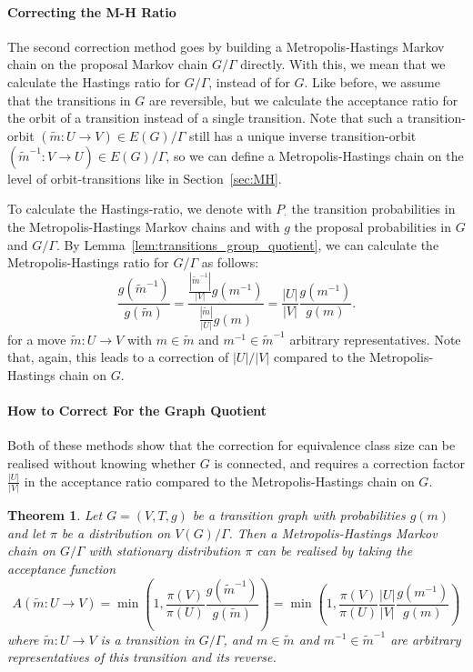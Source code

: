\documentclass{article}
\newtheorem{theorem}{Theorem}
\theoremstyle{definition}
\begin{document}
\paragraph{Correcting the M-H Ratio} 
The second correction method goes by building a Metropolis-Hastings Markov chain on the proposal Markov chain $G/\Gamma$ directly. With this, we mean that we calculate the Hastings ratio for $G/\Gamma$, instead of for $G$. Like before, we assume that the transitions in $G$ are reversible, but we calculate the acceptance ratio for the orbit of a transition instead of a single transition. Note that such a transition-orbit $(\widetilde{m}:U\to V)\in E(G)/\Gamma$ still has a unique inverse transition-orbit $(\widetilde{m}^{-1}: V\to U)\in E(G)/\Gamma$, so we can define a Metropolis-Hastings chain on the level of orbit-transitions like in Section~\ref{sec:MH}.

To calculate the Hastings-ratio, we denote with $P_{\cdot}$ the transition probabilities in the Metropolis-Hastings Markov chains and with $g$ the proposal probabilities in $G$ and $G/\Gamma$. By Lemma~\ref{lem:transitions_group_quotient}, we can calculate the Metropolis-Hastings ratio for $G/\Gamma$ as follows:
\[
\frac{g(\widetilde{m}^{-1})}{g(\widetilde{m})}
    = \frac{\frac{|\widetilde{m}^{-1}|}{|V|}g(m^{-1})}{\frac{|\widetilde{m}|}{|U|}g(m)}
    = \frac{|U|}{|V|} \frac{g(m^{-1})}{g(m)}.
\]
for a move $\widetilde{m}: U \to V$ with $m\in \widetilde{m}$ and $m^{-1}\in \widetilde{m}^{-1}$ arbitrary representatives. Note that, again, this leads to a correction of $|U|/|V|$ compared to the Metropolis-Hastings chain on $G$.

\paragraph{How to Correct For the Graph Quotient} 
Both of these methods show that the correction for equivalence class size can be realised without knowing whether $G$ is connected, and requires a correction factor $\frac{|U|}{|V|}$ in the acceptance ratio compared to the Metropolis-Hastings chain on $G$.

\begin{theorem}\label{the:quotient_MH}
    Let $G=(V,T,g)$ be a transition graph with probabilities $g(m)$ and let $\pi$ be a distribution on $V(G)/\Gamma$. Then a Metropolis-Hastings Markov chain on $G/\Gamma$ with stationary distribution $\pi$ can be realised by taking the acceptance function
    \[
      A(\widetilde{m}:U\to V) = 
        \min\left(
          1, 
          \frac{\pi(V)}{\pi(U)}\frac{g(\widetilde{m}^{-1})}{g(\widetilde{m})} 
        \right) = 
        \min\left(
          1, 
          \frac{\pi(V)}{\pi(U)}\frac{|U|}{|V|}\frac{g(m^{-1})}{g(m)} 
        \right)
    \]
    where $\widetilde{m}:U \to V$ is a transition in $G/\Gamma$, and $m\in \widetilde{m}$ and $m^{-1}\in \widetilde{m}^{-1}$ are arbitrary representatives of this transition and its reverse.
\end{theorem}
\end{document}
